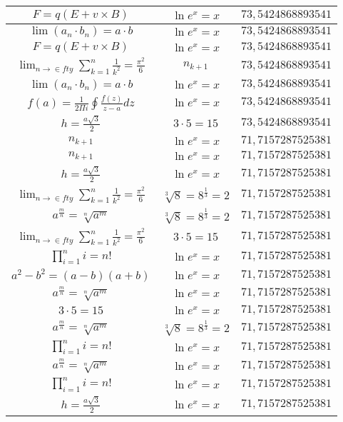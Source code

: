 \documentclass{article}
\begin{document}
\begin{flushleft}
\begin{longtable}{|c|c|c|}
$F=q\left(E+v\times B\right)$ & $\ln e^x=x$ & $73,5424868893541$ \\ \hline 
$\lim\left(a_n\cdot b_n\right)=a\cdot b$ & $\ln e^x=x$ & $73,5424868893541$ \\ \hline 
$F=q\left(E+v\times B\right)$ & $\ln e^x=x$ & $73,5424868893541$ \\ \hline 
$\lim_{n\to\in fty}\sum_{k=1}^n\frac{1}{k^2}=\frac{\pi^2}{6}$ & $n_{k+1}$ & $73,5424868893541$ \\ \hline 
$\lim\left(a_n\cdot b_n\right)=a\cdot b$ & $\ln e^x=x$ & $73,5424868893541$ \\ \hline 
$f\left(a\right)=\frac{1}{2\Pi i}\oint\frac{f\left(z\right)}{z-a}dz$ & $\ln e^x=x$ & $73,5424868893541$ \\ \hline 
$h=\frac{a\sqrt{3}}{2}$ & $3\cdot 5=15$ & $73,5424868893541$ \\ \hline 
$n_{k+1}$ & $\ln e^x=x$ & $71,7157287525381$ \\ \hline 
$n_{k+1}$ & $\ln e^x=x$ & $71,7157287525381$ \\ \hline 
$h=\frac{a\sqrt{3}}{2}$ & $\ln e^x=x$ & $71,7157287525381$ \\ \hline 
$\lim_{n\to\in fty}\sum_{k=1}^n\frac{1}{k^2}=\frac{\pi^2}{6}$ & $\sqrt[3]{8}=8^{\frac{1}{3}}=2$ & $71,7157287525381$ \\ \hline 
$a^{\frac{m}{n}}=\sqrt[n]{a^{m}}$ & $\sqrt[3]{8}=8^{\frac{1}{3}}=2$ & $71,7157287525381$ \\ \hline 
$\lim_{n\to\in fty}\sum_{k=1}^n\frac{1}{k^2}=\frac{\pi^2}{6}$ & $3\cdot 5=15$ & $71,7157287525381$ \\ \hline 
$\prod_{i=1}^ni=n!$ & $\ln e^x=x$ & $71,7157287525381$ \\ \hline 
$a^2-b^2=(a-b)(a+b)$ & $\ln e^x=x$ & $71,7157287525381$ \\ \hline 
$a^{\frac{m}{n}}=\sqrt[n]{a^{m}}$ & $\ln e^x=x$ & $71,7157287525381$ \\ \hline 
$3\cdot 5=15$ & $\ln e^x=x$ & $71,7157287525381$ \\ \hline 
$a^{\frac{m}{n}}=\sqrt[n]{a^{m}}$ & $\sqrt[3]{8}=8^{\frac{1}{3}}=2$ & $71,7157287525381$ \\ \hline 
$\prod_{i=1}^ni=n!$ & $\ln e^x=x$ & $71,7157287525381$ \\ \hline 
$a^{\frac{m}{n}}=\sqrt[n]{a^{m}}$ & $\ln e^x=x$ & $71,7157287525381$ \\ \hline 
$\prod_{i=1}^ni=n!$ & $\ln e^x=x$ & $71,7157287525381$ \\ \hline 
$h=\frac{a\sqrt{3}}{2}$ & $\ln e^x=x$ & $71,7157287525381$ \\ \hline 

\end{longtable}
\end{flushleft}
\end{document}
